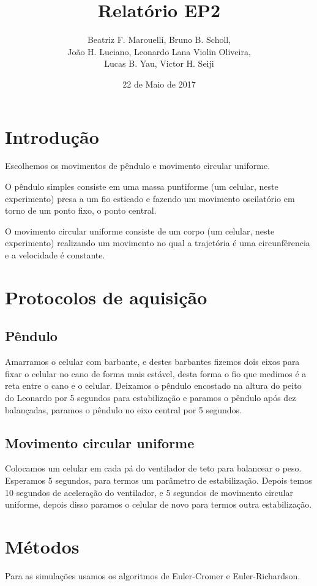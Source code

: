 \documentclass[a4paper, 12pt]{article}
\title{Relatório EP2}
\author{Beatriz F. Marouelli, Bruno B. Scholl, \\João H. Luciano, Leonardo Lana Violin Oliveira, \\ Lucas B. Yau, Victor H. Seiji}
\date{22 de Maio de 2017}
\begin{document}
\maketitle

\section*{Introdução}
Escolhemos os movimentos de pêndulo e movimento circular uniforme. 

O pêndulo simples consiste em uma massa puntiforme (um celular, neste experimento) presa a um fio esticado e fazendo um movimento oscilatório em torno de um ponto fixo, o ponto central.

O movimento circular uniforme consiste de um corpo (um celular, neste experimento) realizando um movimento no qual a trajetória é uma circunfêrencia e a velocidade é constante.

\section*{Protocolos de aquisição}

\subsection*{Pêndulo}
Amarramos o celular com barbante, e destes barbantes fizemos dois eixos para fixar o celular no cano de forma mais estável, desta forma o fio que medimos é a reta entre o cano e o celular. Deixamos o pêndulo encostado na altura do peito do Leonardo por 5 segundos para estabilização e paramos o pêndulo após dez balançadas, paramos o pêndulo no eixo central por 5 segundos.

\subsection*{Movimento circular uniforme}
Colocamos um celular em cada pá do ventilador de teto para balancear o peso. Esperamos 5 segundos, para termos um parâmetro de estabilização. Depois temos 10 segundos de aceleração do ventilador, e 5 segundos de movimento circular uniforme, depois disso paramos o celular de novo para termos outra estabilização.

\section*{Métodos}
Para as simulações usamos os algoritmos de Euler-Cromer e Euler-Richardson.
\end{document}
